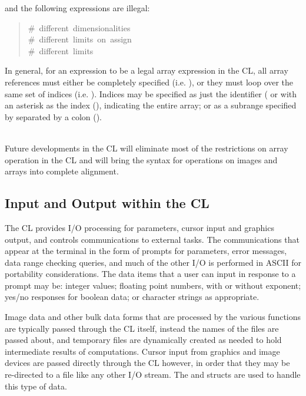 \noindent
and the following expressions are illegal:


\begin{quotation}\noindent
{}  \hfill \#~different~dimensionalities \\
  \hfill \#~different~limits~on~assign \\
  \hfill \#~different~limits  
\end{quotation}

In general, for an expression to be a legal array expression in the
CL, all array references must either be completely specified
(i.e. ), or they must loop over the same set of indices
(i.e. ).  Indices may be 
specified as just the identifier ( or with an
asterisk as the index (), indicating the entire array;
or as a subrange specified by   separated
by a colon ().  

 \\
Future developments in the CL will eliminate most of the restrictions
on array operation in the CL and will bring the syntax for operations 
on images and arrays into complete alignment.

\subsection{Input and Output within the CL}

The CL provides I/O processing for parameters, cursor input and graphics
output, and controls communications to external tasks.  The communications
that appear at the terminal in the form of prompts for parameters, 
error messages, data range checking queries, and much of the other I/O
is performed in ASCII for portability considerations.  The data items that 
a user can input in response to a prompt may be:
integer values; floating point numbers, with or without exponent; 
yes/no responses for boolean data; or character strings as appropriate.

Image data and other bulk data forms that are processed by the various
functions are typically  passed through
the CL itself, instead the names of the files are passed about, and
temporary files are dynamically created as needed to hold intermediate
results of computations.  Cursor input from graphics and image devices
are passed directly through the CL however, in order that they may be 
re-directed to a file like any other I/O stream.  The  and
 structs are used to handle this type of data.


